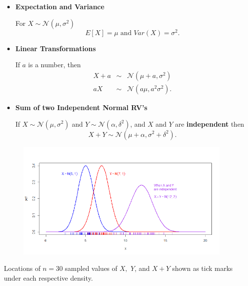 \documentclass[smaller]{beamer}\usepackage[]{graphicx}\usepackage[]{color}
\newcommand{\N}{\mathcal{N}}
\newenvironment{stepitemize}{\begin{itemize}[<+->]}{\end{itemize} }
\begin{document}
\begin{frame}{\secname}

  \begin{stepitemize}
  \item \textbf{Expectation and Variance} \medskip

  For $X\sim \N\left( \mu ,\sigma ^{2}\right)$
  \begin{equation*}
  E\left[ X\right] =\mu \text{ and }Var\left( X\right) =\sigma ^{2}.
  \end{equation*}

  \item \textbf{Linear Transformations} \medskip

  If $a$ is a number, then
  \begin{eqnarray*}
  X+a &\sim &\N\left( \mu +a,\sigma ^{2}\right) \\
  aX &\sim &\N\left( a\mu ,a^{2}\sigma ^{2}\right).
  \end{eqnarray*}

  \item \textbf{Sum of two Independent Normal RV's} \medskip

  If $X\sim \N\left( \mu ,\sigma ^{2}\right) $ and $Y\sim \N\left( \alpha
  ,\delta ^{2}\right) $, and $X$ and $Y$ are \textbf{independent} then%
  \begin{equation*}
  X+Y\sim \N\left( \mu +\alpha ,\sigma ^{2}+\delta ^{2}\right).
  \end{equation*}
  \end{stepitemize}
\end{frame}


\begin{frame}{\secname}
  \begin{figure}[ptb]\centering
  \includegraphics[width=0.95\textwidth,height=0.7\textheight]{img/sum_of_two_independent_normals_with_rug__1.pdf}%
  \end{figure}
  Locations of $n=30$ sampled values of $X,$ $Y$, and $X+Y$ shown as tick marks under each respective density.
\end{frame}
\end{document}

